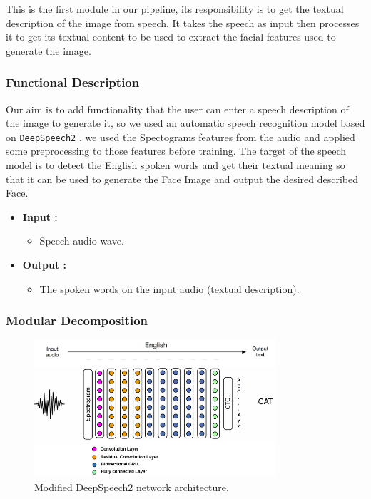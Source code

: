 This is the first module in our pipeline, its responsibility is to get the textual description of the image from speech. It takes the speech as input then processes it to get its textual content to be used to extract the facial features used to generate the image.

\subsubsection{Functional Description}

Our aim is to add functionality that the user can enter a speech description of the image to generate it, so we used an automatic speech recognition model based on \texttt{DeepSpeech2} \cite{amodei2015deep}, we used the Spectograms features from the audio and applied some preprocessing to those features before training. The target of the speech model is to detect the English spoken words and get their textual meaning so that it can be used to generate the Face Image and output the desired described Face.

\begin{itemize}
    \item \textbf{Input :}
    \begin{itemize}
        \item Speech audio wave.
    \end{itemize}
    \item \textbf{Output :}
    \begin{itemize}
        \item The spoken words on the input audio (textual description).
    \end{itemize}
\end{itemize}

\subsubsection{Modular Decomposition}

\begin{figure}[H]
    \centering
    \includegraphics[width=0.8\textwidth]{images/speech.png}
    \caption{Modified DeepSpeech2 network architecture.}
    \label{fig:speechModel}
\end{figure}

